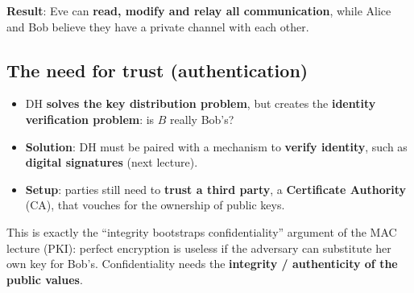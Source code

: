 \textbf{Result}: Eve can \textbf{read, modify and relay all communication}, while Alice and Bob believe they have a private channel with each other.

\subsection{The need for trust (authentication)}

\begin{itemize}
    \item DH \textbf{solves the key distribution problem}, but creates the \textbf{identity verification problem}: is $B$ really Bob's?
    \item \textbf{Solution}: DH must be paired with a mechanism to \textbf{verify identity}, such as \textbf{digital signatures} (next lecture).
    \item \textbf{Setup}: parties still need to \textbf{trust a third party}, a \textbf{Certificate Authority} (CA), that vouches for the ownership of public keys.
\end{itemize}

\begin{remark}
This is exactly the ``integrity bootstraps confidentiality'' argument of the MAC lecture (PKI): perfect encryption is useless if the adversary can substitute her own key for Bob's. Confidentiality needs the \textbf{integrity / authenticity of the public values}.
\end{remark}
